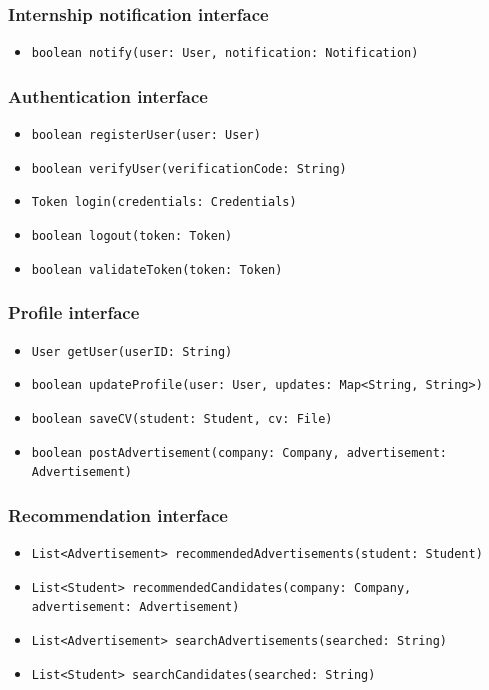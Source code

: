 \subsubsection{Internship notification interface}
\begin{itemize}
    \item \verb|boolean notify(user: User, notification: Notification)|
\end{itemize}

\subsubsection{Authentication interface}
\begin{itemize}
    \item \verb|boolean registerUser(user: User)|
    \item \verb|boolean verifyUser(verificationCode: String)|
    \item \verb|Token login(credentials: Credentials)|
    \item \verb|boolean logout(token: Token)|
    \item \verb|boolean validateToken(token: Token)|
\end{itemize}

\subsubsection{Profile interface}
\begin{itemize}
    \item \verb|User getUser(userID: String)|
    \item \verb|boolean updateProfile(user: User, updates: Map<String, String>)|
    \item \verb|boolean saveCV(student: Student, cv: File)|
    \item \verb|boolean postAdvertisement(company: Company, advertisement: Advertisement)|
\end{itemize}

\subsubsection{Recommendation interface}
\begin{itemize}
    \item \verb|List<Advertisement> recommendedAdvertisements(student: Student)|
    \item \verb|List<Student> recommendedCandidates(company: Company, | \\ \makebox[10em][l]{} \verb|advertisement: Advertisement)|
    \item \verb|List<Advertisement> searchAdvertisements(searched: String)|
    \item \verb|List<Student> searchCandidates(searched: String)|
\end{itemize}

